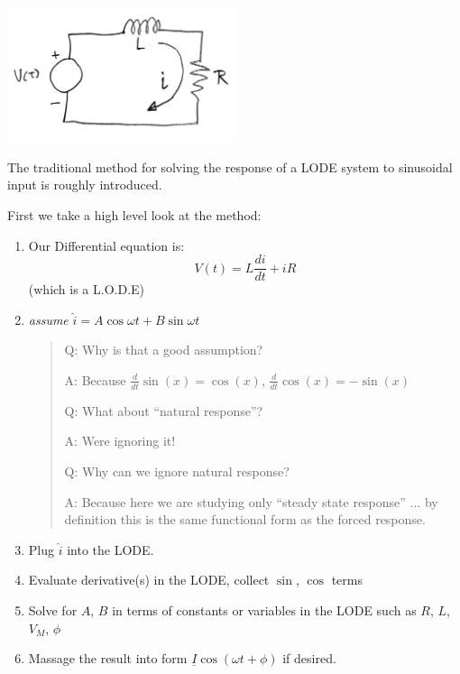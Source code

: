 \includegraphics[width=0.5\textwidth]{figsChapt02/DI63347.png}


The traditional method for solving the response of a LODE system to sinusoidal input is roughly
introduced.

\noindent
First we take a high level look at the method:

\begin{enumerate}
\item Our Differential equation is:
\[
V(t) = L\frac{di}{dt} + iR
\]
(which is a L.O.D.E)

\item {\it assume} $\hat{i} = A\cos\omega t + B\sin\omega t$

\begin{quotation}
Q: Why is that a good assumption?

A: Because $\frac{d}{dt}\sin(x) = \cos(x)$, $\frac{d}{dt}\cos(x) = -\sin(x)$

Q: What about ``natural response''?

A: Were ignoring it!

Q: Why can we ignore natural response?

A: Because here we are studying only ``steady state response'' ... by definition this is
the same functional form as the forced response.
\end{quotation}

\item Plug   $\hat{i}$ into the LODE.

\item Evaluate derivative(s) in the LODE, collect $\sin$, $\cos$ terms

\item Solve for $A$, $B$ in terms of constants or variables in the LODE such as $R$, $L$, $V_M$, $\phi$

\item Massage the result into form $\underline{I}\cos(\omega t + \phi)$
if desired.
\end{enumerate}

\vspace{0.25in}

